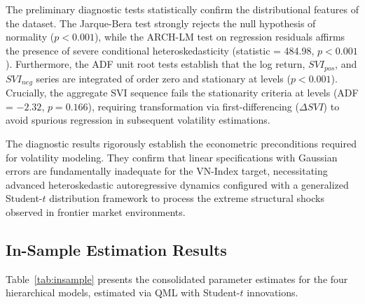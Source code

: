 \documentclass[12pt, a4paper]{article}
\begin{document}
The preliminary diagnostic tests statistically confirm the distributional features of the dataset. The Jarque-Bera test strongly rejects the null hypothesis of normality ($p < 0.001$), while the ARCH-LM test on regression residuals affirms the presence of severe conditional heteroskedasticity (statistic = 484.98, $p < 0.001$). Furthermore, the ADF unit root tests establish that the log return, $SVI_{pos}$, and $SVI_{neg}$ series are integrated of order zero and stationary at levels ($p < 0.001$). Crucially, the aggregate SVI sequence fails the stationarity criteria at levels (ADF = $-2.32$, $p = 0.166$), requiring transformation via first-differencing ($\Delta SVI$) to avoid spurious regression in subsequent volatility estimations.

The diagnostic results rigorously establish the econometric preconditions required for volatility modeling. They confirm that linear specifications with Gaussian errors are fundamentally inadequate for the VN-Index target, necessitating advanced heteroskedastic autoregressive dynamics configured with a generalized Student-$t$ distribution framework to process the extreme structural shocks observed in frontier market environments.

\subsection{In-Sample Estimation Results}

Table~\ref{tab:insample} presents the consolidated parameter estimates for the four hierarchical models, estimated via QML with Student-$t$ innovations.
\end{document}
